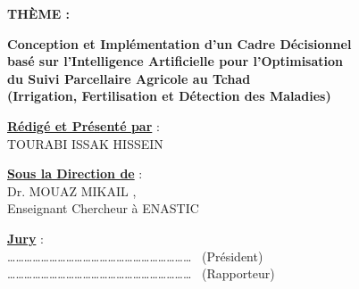 \begin{titlepage}
\begin{tcolorbox}[
	enhanced,
	colback=white,
	colframe=blue,
	boxrule=2pt,
	arc=5mm,
	width=17cm,
	center title,
	left=4mm,
	right=7mm,
	top=3mm,
	bottom=3mm
	]
	\begin{center}
		
		{\LARGE\bfseries THÈME : }
		
		\vspace{0.2cm}
		
		{\Large\bfseries
			Conception et Implémentation d'un Cadre Décisionnel\\[0.3cm]
			basé sur l'Intelligence Artificielle pour l'Optimisation\\[0.3cm]
			du Suivi Parcellaire Agricole au Tchad\\[0.4cm]
			\large (Irrigation, Fertilisation et Détection des Maladies)
		}
		
	\end{center}
	
\end{tcolorbox}
	\vspace{1.6cm}
	
	\noindent
	\begin{minipage}[t]{0.46\textwidth}
		\underline{\textbf{Rédigé et Présenté par}} :\\[10pt]
		TOURABI ISSAK HISSEIN
	\end{minipage}
	\hfill
	\begin{minipage}[t]{0.50\textwidth}
		\underline{\textbf{Sous la Direction de}} :\\[10pt]
		Dr. MOUAZ MIKAIL ,\\
		Enseignant Chercheur à ENASTIC
	\end{minipage}
	
	\vspace{1.8cm}
	
	\noindent\underline{\textbf{Jury}} :\\
	\ldots\ldots\ldots\ldots\ldots\ldots\ldots\ldots\ldots\ldots\ldots \ldots\ldots\ldots\ldots\ldots\ldots\ldots\ldots\ldots\ldots\ldots
	\ (Président)\\[6pt]
	\ldots\ldots\ldots\ldots\ldots\ldots\ldots\ldots\ldots\ldots\ldots \ldots\ldots\ldots\ldots\ldots\ldots\ldots\ldots\ldots\ldots\ldots
	\ (Rapporteur)
	
	\vfill
	
	\begin{center}
	\end{center}
	
\end{titlepage}